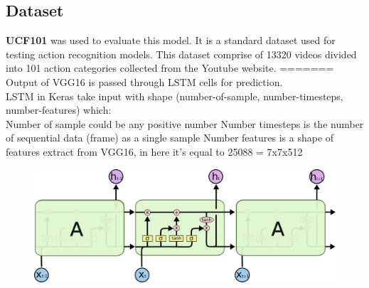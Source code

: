 \subsection{Dataset}
\textbf{UCF101} was used to evaluate this model. It is a standard dataset used for testing action recognition models. This dataset comprise of 13320 videos divided into 101 action categories collected from the Youtube website.
=======
Output of VGG16 is passed through LSTM cells for prediction.\\
LSTM in Keras take input with shape (number-of-sample, number-timesteps, number-features) which:\\
Number of sample could be any positive number
Number timesteps is the number of sequential data (frame) as a single sample
Number features is a shape of features extract from VGG16, in here it's equal to 25088 = 7x7x512\\

\begin{center}
	\begin{figure}[H]
		\centering
		\includegraphics[width=1\columnwidth]{images/chap3/lstm-chain.png}
		\label{chap3:lstm-chain}
	\end{figure}
\end{center}

